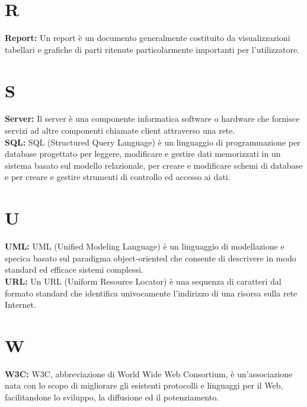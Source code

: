 {\section*{R}
\hypertarget{report}{}
\textbf{Report:}
Un report \`e un documento generalmente costituito da visualizzazioni tabellari e grafiche di parti ritenute particolarmente importanti per l'utilizzatore.

\section*{S}
\hypertarget{server}{}
\textbf{Server:}
Il server \`e una componente informatica software o hardware che fornisce servizi ad altre componenti chiamate client attraverso una rete. \\


\hypertarget{sql}{}
\noindent
\textbf{SQL:}
SQL (Structured Query Language) \`e un linguaggio di programmazione per database progettato per leggere, modificare e gestire dati memorizzati in un sistema basato sul modello relazionale, per creare e modificare schemi di database e per creare e gestire strumenti di controllo ed accesso ai dati.\\

\section*{U}
\hypertarget{uml}{}
\textbf{UML:}
UML (Unified Modeling Language) \`e un  linguaggio di modellazione e specica basato sul paradigma object-oriented che consente di descrivere in modo standard ed efficace sistemi complessi.\\

\hypertarget{url}{}
\noindent 
\textbf{URL:}
Un URL (Uniform Resource Locator) \`e una sequenza di caratteri dal formato standard che identifica univocamente l'indirizzo di una risorsa sulla rete Internet.

\section*{W}
\hypertarget{w3c}{}
\textbf{W3C:}
W3C, abbreviazione di World Wide Web Consortium, \`e un'associazione nata con lo scopo di migliorare gli esistenti protocolli e linguaggi per il Web, facilitandone lo sviluppo, la diffusione ed il potenziamento.

\clearpage{\pagestyle{empty}\cleardoublepage


}}
